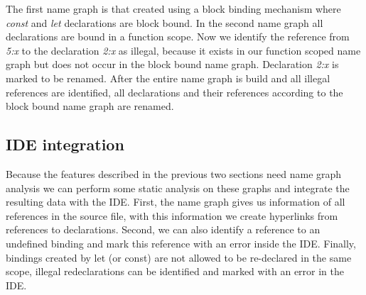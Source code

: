 \begin{figure}
\begin{subfigure}{.45\textwidth}
\centering
{}
\end{subfigure}
\hfill
\begin{subfigure}{.45\textwidth}
\centering
{}
\end{subfigure}
\end{figure}

The first name graph is that created using a block binding mechanism where \textit{const} and \textit{let} declarations are block bound. In the second name graph all declarations are bound in a function scope. Now we identify the reference from \textit{5:x} to the declaration \textit{2:x} as illegal, because it exists in our function scoped name graph but does not occur in the block bound name graph. Declaration \textit{2:x} is marked to be renamed. After the entire name graph is build and all illegal references are identified, all declarations and their references according to the block bound name graph are renamed.

\subsection{IDE integration}
Because the features described in the previous two sections need name graph analysis we can perform some static analysis on these graphs and integrate the resulting data with the IDE. First, the name graph gives us information of all references in the source file, with this information we create hyperlinks from references to declarations. Second, we can also identify a reference to an undefined binding and mark this reference with an error inside the IDE. Finally, bindings created by let (or const) are not allowed to be re-declared in the same scope, illegal redeclarations can be identified and marked with an error in the IDE.
